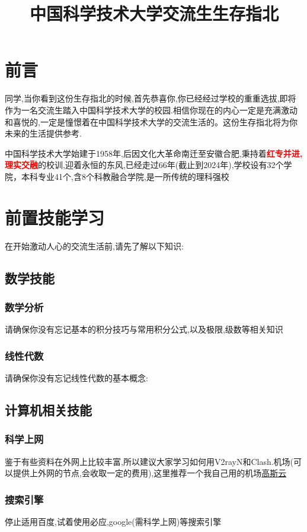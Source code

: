 \documentclass{ctexart}
\title{中国科学技术大学交流生生存指北}
\author{ }
\date{ }
\begin{document}
\maketitle

\section{前言}
同学,当你看到这份生存指北的时候,首先恭喜你,你已经经过学校的重重选拔,即将作为一名交流生踏入中国科学技术大学的校园.相信你现在的内心一定是充满激动和喜悦的,一定是憧憬着在中国科学技术大学的交流生活的。这份生存指北将为你未来的生活提供参考.
\par 中国科学技术大学始建于1958年,后因文化大革命南迁至安徽合肥,秉持着{\bf{\textcolor{red}{红专并进,理实交融}}}的校训,迎着永恒的东风,已经走过66年(截止到2024年),学校设有32个学院，本科专业41个,含8个科教融合学院,是一所传统的理科强校

\section{前置技能学习}
在开始激动人心的交流生活前,请先了解以下知识:
\subsection{数学技能}
\subsubsection{数学分析}
请确保你没有忘记基本的积分技巧与常用积分公式,以及极限,级数等相关知识
\subsubsection{线性代数}
请确保你没有忘记线性代数的基本概念:
\subsection{计算机相关技能}
\subsubsection{科学上网}
鉴于有些资料在外网上比较丰富,所以建议大家学习如何用V2rayN和Clash.机场(可以提供上外网的节点,会收取一定的费用),这里推荐一个我自己用的机场\href{https://la.gsoula.life/}{高斯云}
\subsubsection{搜索引擎}
停止适用百度,试着使用必应,google(需科学上网)等搜索引擎
\end{document}
